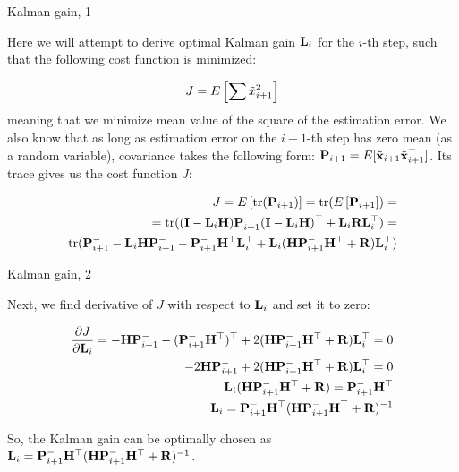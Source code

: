 \documentclass{beamer}
\newcommand{\btil}[1] {\Tilde{\mathbf{#1}}}
\begin{document}
\begin{frame}{Kalman gain, 1}
	\begin{flushleft}
		
		Here we will attempt to derive optimal Kalman gain $\mathbf{L}_i$ for the $i$-th step, such that the following cost function is minimized:
		
		\begin{equation}
			J = E \left[ \sum \Tilde x_{i+1}^2  \right]
		\end{equation}
		meaning that we minimize mean value of the square of the estimation error. We also know that as long as estimation error on the $i+1$-th step has zero mean (as a random variable), covariance takes the following form: $\bo{P}_{i+1} = E [ \btil{x}_{i+1} \btil{x}_{i+1}\T ]$. Its trace gives us the cost function $J$:
		
		\begin{align*}
			J = E \left[ \text{tr}(\mathbf{P}_{i+1})  \right] =
			\text{tr} (E \left[ \mathbf{P}_{i+1}  \right]) = \\
			= \text{tr}(
			(\mathbf{I} - \mathbf{L}_i \mathbf{H}) \mathbf{P}_{i+1}^- (\mathbf{I} - \mathbf{L}_i \mathbf{H})^\top +\mathbf{L}_i\mathbf{R}\mathbf{L}_i^\top
			) = \\
			\text{tr}(
			\mathbf{P}_{i+1}^- - \mathbf{L}_i \mathbf{H} \mathbf{P}_{i+1}^- 
			- \mathbf{P}_{i+1}^- \mathbf{H}^\top \mathbf{L}_i^\top
			+ \mathbf{L}_i (\mathbf{H}\mathbf{P}_{i+1}^- \mathbf{H}^\top + \mathbf{R}) \mathbf{L}_i^\top
			)
		\end{align*}		
		
		
	\end{flushleft}
\end{frame}



\begin{frame}{Kalman gain, 2}
	\begin{flushleft}
		
		Next, we find derivative of $J$ with respect to $\mathbf{L}_i$ and set it to zero:
		
		\begin{align*}
			\frac{\partial J}{\partial \mathbf{L}_i} 
			= 
			-\mathbf{H} \mathbf{P}_{i+1}^- -(\mathbf{P}_{i+1}^- \mathbf{H}^\top)^\top + 
			2(\mathbf{H}\mathbf{P}_{i+1}^- \mathbf{H}^\top + \mathbf{R}) \mathbf{L}_i^\top = 0
			\\
			-2 \mathbf{H} \mathbf{P}_{i+1}^- + 2(\mathbf{H}\mathbf{P}_{i+1}^- \mathbf{H}^\top + \mathbf{R}) \mathbf{L}_i^\top = 0
			\\
			\mathbf{L}_i (\mathbf{H}\mathbf{P}_{i+1}^- \mathbf{H}^\top + \mathbf{R}) = \mathbf{P}_{i+1}^- \mathbf{H}^\top
			\\
			\mathbf{L}_i = \mathbf{P}_{i+1}^- \mathbf{H}^\top (\mathbf{H}\mathbf{P}_{i+1}^- \mathbf{H}^\top + \mathbf{R})^{-1}
		\end{align*}		
		
		
So, the Kalman gain can be optimally chosen as $\mathbf{L}_i = \mathbf{P}_{i+1}^- \mathbf{H}^\top (\mathbf{H}\mathbf{P}_{i+1}^- \mathbf{H}^\top + \mathbf{R})^{-1}$.
		
	\end{flushleft}
\end{frame}
\end{document}
